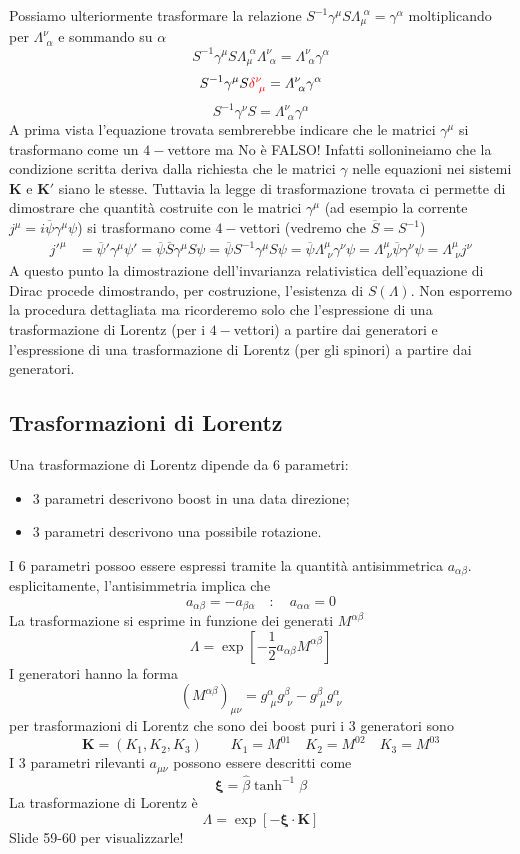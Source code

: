 Possiamo ulteriormente trasformare la relazione $S^{-1}\gamma^\mu S \Lambda_\mu^{\,\,\alpha} = \gamma^\alpha$ moltiplicando per $\Lambda^\nu_{\,\,\alpha}$ e sommando su $\alpha$
$$
S^{-1}\gamma^\mu S \Lambda_\mu^{\,\,\alpha} \Lambda^\nu_{\,\,\alpha} = \Lambda^\nu_{\,\,\alpha} \gamma^\alpha
$$
$$
S^{-1}\gamma^\mu S \textcolor{red}{\delta^\nu_{\,\,\mu}} = \Lambda^\nu_{\,\,\alpha} \gamma^\alpha
$$
$$
S^{-1}\gamma^\nu S = \Lambda^\nu_{\,\,\alpha} \gamma^\alpha
$$
A prima vista l'equazione trovata sembrerebbe indicare che le matrici $\gamma^\mu$ si trasformano come un $4-$vettore ma No è FALSO! Infatti sollonineiamo che la condizione scritta deriva dalla richiesta che le matrici $\gamma$ nelle equazioni nei sistemi $\mathbf{K}$ e $\mathbf{K}'$ siano le stesse. Tuttavia la legge di trasformazione trovata ci permette di dimostrare che quantità costruite con le matrici $\gamma^\mu$ (ad esempio la corrente $j^\mu=i\overline{\psi}\gamma^\mu\psi$) si trasformano come $4-$vettori (vedremo che $\overline{S}=S^{-1}$)
\begin{align*}
j'^\mu &= \overline{\psi}'\gamma^\mu \psi' = \overline{\psi}\overline{S}\gamma^\mu S\psi= \overline{\psi} S^{-1}\gamma^\mu S \psi = \overline{\psi} \Lambda^\mu_{\,\,\nu} \gamma^\nu \psi = \Lambda^\mu_{\,\,\nu} \overline{\psi} \gamma^\nu \psi = \Lambda^\mu_{\,\,\nu} j^\nu
\end{align*}
A questo punto la dimostrazione dell'invarianza relativistica dell'equazione di Dirac procede dimostrando, per costruzione, l'esistenza di $S(\Lambda)$. Non esporremo la procedura dettagliata ma ricorderemo solo che l'espressione di una trasformazione di Lorentz (per i $4-$vettori) a partire dai generatori e l'espressione di una trasformazione di Lorentz (per gli spinori) a partire dai generatori.
\subsection{Trasformazioni di Lorentz}
Una trasformazione di Lorentz dipende da $6$ parametri:
\begin{itemize}
    \item 3 parametri descrivono boost in una data direzione;
    \item 3 parametri descrivono una possibile rotazione.
\end{itemize}
I 6 parametri possoo essere espressi tramite la quantità antisimmetrica $a_{\alpha\beta}$. esplicitamente, l'antisimmetria implica che
\begin{equation*}
    a_{\alpha\beta} = - a_{\beta\alpha} \quad : \quad a_{\alpha\alpha} = 0
\end{equation*}
La trasformazione si esprime in funzione dei generati $M^{\alpha\beta}$
$$
\Lambda = \exp \left[ -\frac{1}{2} a_{\alpha\beta} M^{\alpha\beta} \right]
$$
I generatori hanno la forma
$$
(M^{\alpha\beta})_{\mu\nu} = g^{\alpha}_{\,\,\mu} g^{\beta}_{\,\,\nu} - g^{\beta}_{\,\,\mu}g^{\alpha}_{\,\,\nu}
$$
per trasformazioni di Lorentz che sono dei boost puri i 3 generatori sono
$$
\mathbf{K} = (K_1, K_2, K_3) \qquad K_1 = M^{01} \quad K_2 = M^{02} \quad K_3 = M^{03}
$$
I 3 parametri rilevanti $a_{\mu\nu}$ possono essere descritti come
$$
\boldsymbol{\xi} = \hat{\beta} \tanh^{-1} \beta
$$
La trasformazione di Lorentz è
$$
\Lambda = \exp[-\boldsymbol{\xi} \cdot \mathbf{K}]
$$
Slide 59-60 per visualizzarle!
